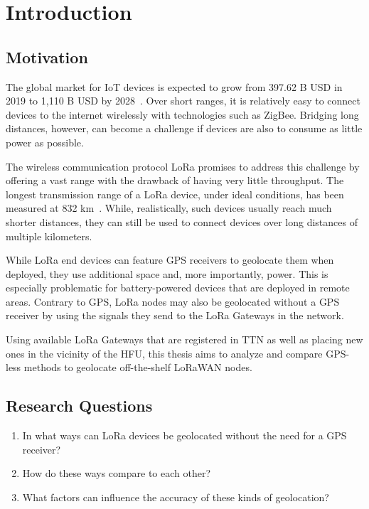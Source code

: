\chapter{Introduction}

\section{Motivation}

The global market for \ac{IoT} devices is expected to grow from 397.62 B USD in 2019 to 1,110 B USD by 2028~\cite{grand_view_research_global_2022}.
Over short ranges, it is relatively easy to connect devices to the internet wirelessly with technologies such as ZigBee.
Bridging long distances, however, can become a challenge if devices are also to consume as little power as possible.

The wireless communication protocol \ac{LoRa} promises to address this challenge by offering a vast range with the drawback of having very little throughput.
The longest transmission range of a \ac{LoRa} device, under ideal conditions, has been measured at 832 km~\cite{the_things_network_global_team_lora_nodate}.
While, realistically, such devices usually reach much shorter distances, they can still be used to connect devices over long distances of multiple kilometers.

While \ac{LoRa} end devices can feature \ac{GPS} receivers to geolocate them when deployed, they use additional space and, more importantly, power.
This is especially problematic for battery-powered devices that are deployed in remote areas.
Contrary to \ac{GPS}, \ac{LoRa} nodes may also be geolocated without a \ac{GPS} receiver by using the signals they send to the \ac{LoRa} Gateways in the network.

Using available \ac{LoRa} Gateways that are registered in \acf{TTN} as well as placing new ones in the vicinity of the \acf{HFU}, this thesis aims to analyze and compare \ac{GPS}-less methods to geolocate off-the-shelf \ac{LoRaWAN} nodes.

\section{Research Questions}

\begin{enumerate}
    \item In what ways can \ac{LoRa} devices be geolocated without the need for a \ac{GPS} receiver?
    \item How do these ways compare to each other?
    \item What factors can influence the accuracy of these kinds of geolocation?
\end{enumerate}


